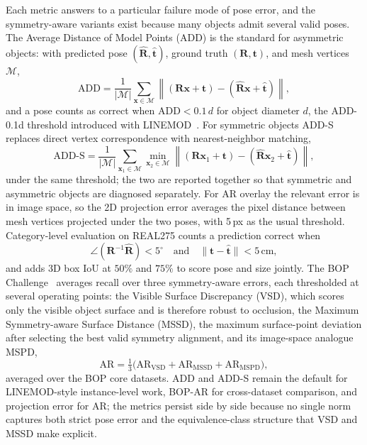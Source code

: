 Each metric answers to a particular failure mode of pose error, and the symmetry-aware variants exist because many objects admit several valid poses.
The Average Distance of Model Points (ADD) is the standard for asymmetric objects: with predicted pose $(\hat{\mathbf{R}}, \hat{\mathbf{t}})$, ground truth $(\mathbf{R}, \mathbf{t})$, and mesh vertices $\mathcal{M}$,
\begin{equation}
    \mathrm{ADD} = \frac{1}{|\mathcal{M}|} \sum_{\mathbf{x} \in \mathcal{M}}
    \left\| (\mathbf{R}\mathbf{x} + \mathbf{t}) - (\hat{\mathbf{R}}\mathbf{x} + \hat{\mathbf{t}}) \right\|,
\end{equation}
and a pose counts as correct when $\mathrm{ADD} < 0.1\,d$ for object diameter $d$, the ADD-0.1d threshold introduced with LINEMOD~\cite{hinterstoisser2012linemod}.
For symmetric objects ADD-S replaces direct vertex correspondence with nearest-neighbor matching,
\begin{equation}
    \mathrm{ADD\text{-}S} = \frac{1}{|\mathcal{M}|} \sum_{\mathbf{x}_1 \in \mathcal{M}}
    \min_{\mathbf{x}_2 \in \mathcal{M}}
    \left\| (\mathbf{R}\mathbf{x}_1 + \mathbf{t}) - (\hat{\mathbf{R}}\mathbf{x}_2 + \hat{\mathbf{t}}) \right\|,
\end{equation}
under the same threshold; the two are reported together so that symmetric and asymmetric objects are diagnosed separately.
For AR overlay the relevant error is in image space, so the 2D projection error averages the pixel distance between mesh vertices projected under the two poses, with 5\,px as the usual threshold.
Category-level evaluation on REAL275 counts a prediction correct when
\begin{equation}
    \angle(\mathbf{R}^{-1} \hat{\mathbf{R}}) < 5^\circ
    \quad \text{and} \quad
    \| \mathbf{t} - \hat{\mathbf{t}} \| < 5\,\mathrm{cm},
\end{equation}
and adds 3D box IoU at $50\%$ and $75\%$ to score pose and size jointly.
The BOP Challenge~\cite{hodan2018bop} averages recall over three symmetry-aware errors, each thresholded at several operating points: the Visible Surface Discrepancy (VSD), which scores only the visible object surface and is therefore robust to occlusion, the Maximum Symmetry-aware Surface Distance (MSSD), the maximum surface-point deviation after selecting the best valid symmetry alignment, and its image-space analogue MSPD,
\begin{equation}
    \mathrm{AR} = \tfrac{1}{3} \bigl( \mathrm{AR}_{\mathrm{VSD}} + \mathrm{AR}_{\mathrm{MSSD}} + \mathrm{AR}_{\mathrm{MSPD}} \bigr),
\end{equation}
averaged over the BOP core datasets.
ADD and ADD-S remain the default for LINEMOD-style instance-level work, BOP-AR for cross-dataset comparison, and projection error for AR; the metrics persist side by side because no single norm captures both strict pose error and the equivalence-class structure that VSD and MSSD make explicit.

